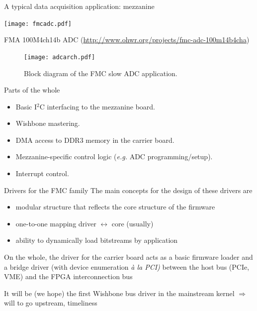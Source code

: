 \documentclass[compress,red]{beamer}
\begin{document}
\begin{frame}{A typical data acquisition application: mezzanine}
\begin{center}
\texttt{[image: fmcadc.pdf]}
\end{center}
\centering
FMA 100M4ch14b ADC
(\url{http://www.ohwr.org/projects/fmc-adc-100m14b4cha})
\end{frame}

\begin{frame}
\begin{figure}[t]
   \centering
   \texttt{[image: adcarch.pdf]}
   \caption{Block diagram of the FMC slow ADC application.}
   \label{slow-adc}
\end{figure}
\end{frame}

\begin{frame}{Parts of the whole}
\begin{itemize}
\item Basic I${}^2$C interfacing to the mezzanine board.
\item Wishbone mastering.
\item DMA access to DDR3 memory in the carrier board.
\item Mezzanine-specific control logic (\emph{e.g.} ADC programming/setup).
\item Interrupt control.
\end{itemize}
\end{frame}

\begin{frame}{Drivers for the FMC family}
The main concepts for the design of these drivers are
\begin{itemize}
\pause
\item modular structure that reflects the core structure of the firmware
\pause
\item one-to-one mapping driver $\leftrightarrow$ core (usually)
\pause
\item ability to dynamically load bitstreams by application
\end{itemize}

\pause
On the whole, the driver for the carrier board acts as a basic firmware
loader and a bridge driver (with device enumeration
\emph{\`a la PCI)} between the host bus (PCIe, VME) and the FPGA
interconnection bus

\pause
It will be (we hope) the first Wishbone bus driver in the mainstream
kernel $\Rightarrow$ will to go upstream, timeliness
\end{frame}
\end{document}
